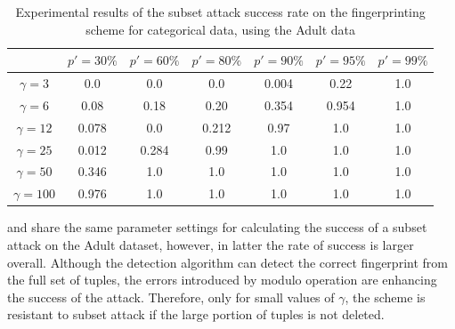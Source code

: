 \begin{table}[ht]
    \centering
    \caption{Experimental results of the subset attack success rate on the fingerprinting scheme for categorical data, using the Adult data}
    \label{tab:subset-attack-adult-experimental}
    \begin{tabular}{|c|c|c|c|c|c|c|}
         \hline
        & \textbf{$p'=30\%$} & \textbf{$p'=60\%$} & \textbf{$p'=80\%$} & \textbf{$p'=90\%$} & \textbf{$p'=95\%$} & \textbf{$p'=99\%$}\\
        \hline
        $\gamma=3$ & 0.0 & 0.0 & 0.0 & 0.004 & 0.22 & 1.0 \\
        \hline
        $\gamma=6$ & 0.08 & 0.18 & 0.20 & 0.354 & 0.954 & 1.0\\
        \hline
        $\gamma=12$ & 0.078 & 0.0 & 0.212 & 0.97 & 1.0 & 1.0 \\
        \hline
        $\gamma=25$ & 0.012 & 0.284 & 0.99 & 1.0 & 1.0 & 1.0 \\
        \hline
        $\gamma=50$ & 0.346 & 1.0 & 1.0 & 1.0 & 1.0 & 1.0 \\
         \hline
        $\gamma=100$ & 0.976 & 1.0 & 1.0 & 1.0 & 1.0 & 1.0 \\
         \hline
     \end{tabular}
\end{table}

 and  share the same parameter settings for calculating the success of a subset attack on the Adult dataset, however, in latter the rate of success is larger overall.
Although the detection algorithm can detect the correct fingerprint from the full set of tuples, the errors introduced by modulo operation are enhancing the success of the attack. 
Therefore, only for small values of $\gamma$, the scheme is resistant to subset attack if the large portion of tuples is not deleted. 


